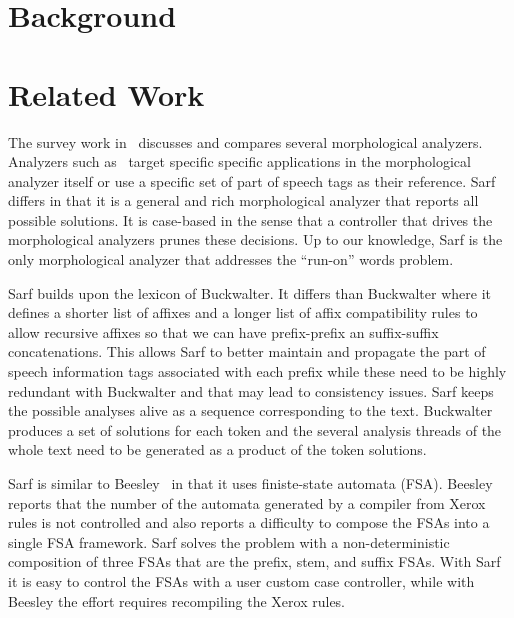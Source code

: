 \documentclass[11pt,letterpaper]{article}
\begin{document}



\section{Background}


\section{Related Work }

The survey work in~\cite{Sughaiyer:04} discusses and compares
several morphological analyzers. 
Analyzers such as~\cite{Khoja:01,Darwish:02} 
target specific specific applications in the morphological 
analyzer itself or use a specific set of part of speech tags
as their reference.
Sarf differs in that it is a general and rich morphological 
analyzer that reports all possible solutions. 
It is case-based in the sense that a controller that drives
the morphological analyzers prunes these decisions. 
Up to our knowledge, Sarf is the only morphological analyzer
that addresses the ``run-on'' words problem. 

Sarf builds upon the lexicon of Buckwalter.
It differs than Buckwalter where it defines a shorter list of affixes
and a longer list of affix compatibility rules to allow recursive 
affixes so that we can have prefix-prefix an suffix-suffix 
concatenations.
This allows Sarf to better maintain and propagate 
the part of speech information
tags associated with each prefix while these need to be highly 
redundant with Buckwalter and that may lead to consistency issues. 
Sarf keeps the possible analyses alive as a sequence corresponding
to the text. Buckwalter produces a set of solutions for each token 
and the several analysis threads of the whole text need to be 
generated as a product of the token solutions. 

Sarf is similar to Beesley~ in that it uses
finiste-state automata (FSA). 
Beesley reports that the number of the automata generated by a compiler
from Xerox rules is not controlled and also reports a difficulty to 
compose the FSAs into a single FSA framework. 
Sarf solves the problem with a non-deterministic composition of three
FSAs that are the prefix, stem, and suffix FSAs. 
With Sarf it is easy to control the FSAs with a user custom case 
controller, while with Beesley the effort requires recompiling the
Xerox rules.
\end{document}
